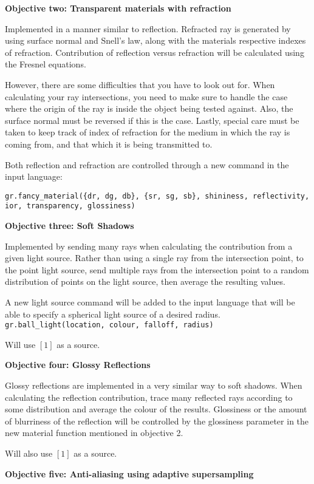 \documentclass {article}
\begin{document}
\begin{description}
{\bf Objective two: Transparent materials with refraction}

Implemented in a manner similar to reflection. Refracted ray is generated by using surface normal and Snell's law, along with the materials respective indexes of refraction. Contribution of reflection versus refraction will be calculated using the Fresnel equations. 

However, there are some difficulties that you have to look out for. When calculating your ray intersections, you need to make sure to handle the case where the origin of the ray is inside the object being tested against. Also, the surface normal must be reversed if this is the case. Lastly, special care must be taken to keep track of index of refraction for the medium in which the ray is coming from, and that which it is being transmitted to.

Both reflection and refraction are controlled through a new command in the input language:

{\tt gr.fancy\_material(\{dr, dg, db\}, \{sr, sg, sb\}, shininess, reflectivity, ior, transparency, glossiness)}

{\bf Objective three: Soft Shadows}

Implemented by sending many rays when calculating the contribution from a given light source. Rather than using a single ray from the intersection point, to the point light source, send multiple rays from the intersection point to a random distribution of points on the light source, then average the resulting values.

A new light source command will be added to the input language that will be able to specify a spherical light source of a desired radius. {\tt gr.ball\_light(location, colour, falloff, radius)}

Will use $[1]$ as a source.

{\bf Objective four: Glossy Reflections}

Glossy reflections are implemented in a very similar way to soft shadows. When calculating the reflection contribution, trace many reflected rays according to some distribution and average the colour of the results. Glossiness or the amount of blurriness of the reflection will be controlled by the glossiness parameter in the new material function mentioned in objective 2.

Will also use $[1]$ as a source.

{\bf Objective five: Anti-aliasing using adaptive supersampling}


\end{description}
\end{document}
